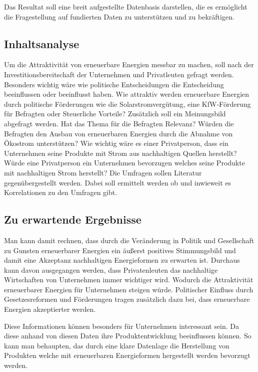 \documentclass[12pt,a4paper]{article}
\begin{document}
Das Resultat soll eine breit aufgestellte Datenbasis darstellen, 
die es ermöglicht die Fragestellung auf fundierten Daten zu unterstützen und zu bekräftigen.  

\subsection*{Inhaltsanalyse}
Um die Attraktivität von erneuerbare Energien messbar zu machen, 
soll nach der Investitionsbereitschaft der Unternehmen und Privatleuten 
gefragt werden. Besonders wichtig wäre wie politische Entscheidungen die 
Entscheidung beeinflussen oder beeinflusst haben. Wie attraktiv werden erneuerbare 
Energien durch politische Förderungen wie die Solarstromvergütung, eine KfW-Förderung 
für Befragten oder Steuerliche Vorteile? 
 Zusätzlich soll ein Meinungsbild abgefragt werden. 
 Hat das Thema für die Befragten Relevanz? Würden die Befragten den 
 Ausbau von erneuerbaren Energien durch die Abnahme von Ökostrom unterstützen? 
 Wie wichtig wäre es einer Privatperson, dass ein Unternehmen seine Produkte mit Strom 
 aus nachhaltigen Quellen herstellt? Würde eine Privatperson ein Unternehmen bevorzugen 
 welches seine Produkte mit nachhaltigen Strom herstellt? Die Umfragen sollen Literatur 
 gegenübergestellt werden. Dabei soll ermittelt werden ob und inwieweit es Korrelationen 
 zu den Umfragen gibt. 

 \subsection*{Zu erwartende Ergebnisse}
 Man kann damit rechnen, dass durch die Veränderung in Politik und Gesellschaft 
 zu Gunsten erneuerbarer Energien ein äußerst positives Stimmungsbild und damit 
 eine Akzeptanz nachhaltigen Energieformen zu erwarten ist. Durchaus kann
 davon ausgegangen werden, dass Privatenleuten das nachhaltige Wirtschaften von Unternehmen
 immer wichtiger wird. Wodurch die Attraktivität erneuerbarer Energien für Unternehmen steigen 
 würde. Politischer Einfluss durch Gesetzesreformen und Förderungen tragen zusätzlich 
 dazu bei, dass erneuerbare Energien akzeptierter werden.

 Diese Informationen können besonders für Unternehmen interessant sein.
 Da diese anhand von diesen Daten ihre Produktentwicklung beeinflussen können.
 So kann man behaupten, das durch eine klare Datenlage die Herstellung von Produkten
 welche mit erneuerbaren Energieformen hergestellt werden bevorzugt werden.

 

\nocite{*}
\printbibliography
\end{document}
